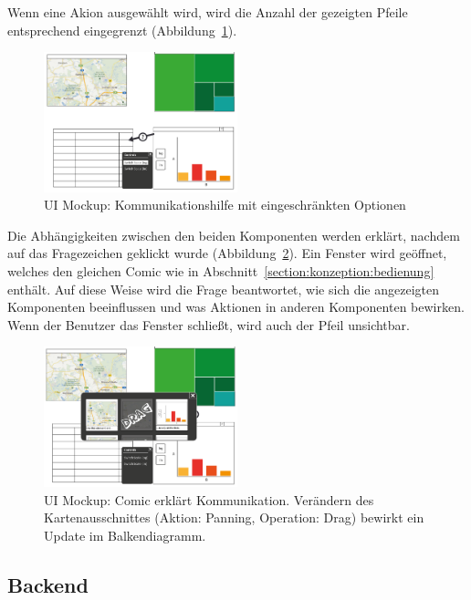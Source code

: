 \documentclass[
	headsepline,
	footsepline,
	fontsize=12pt,
	bibliography=totoc
]{scrbook}
\begin{document}
Wenn eine Akion ausgewählt wird, wird die Anzahl der gezeigten Pfeile entsprechend eingegrenzt (Abbildung~\ref{figure:kommunikation-step2}).

\begin{figure}[htbp]
   \centering
   \includegraphics[width=0.5\textwidth]{images/konzeption-kommunikation-step2.png}
   \caption{UI Mockup: Kommunikationshilfe mit eingeschränkten Optionen}
   \label{figure:kommunikation-step2}
\end{figure}

Die Abhängigkeiten zwischen den beiden Komponenten werden erklärt, nachdem auf das Fragezeichen geklickt wurde (Abbildung~\ref{figure:kommunikation-step3}). Ein Fenster wird geöffnet, welches den gleichen Comic wie in Abschnitt~\ref{section:konzeption:bedienung} enthält. Auf diese Weise wird die Frage beantwortet, wie sich die angezeigten Komponenten beeinflussen und was Aktionen in anderen Komponenten bewirken. Wenn der Benutzer das Fenster schließt, wird auch der Pfeil unsichtbar.

\begin{figure}[htbp]
   \centering
   \includegraphics[width=0.5\textwidth]{images/konzeption-kommunikation-step3.png}
   \caption{UI Mockup: Comic erklärt Kommunikation. Verändern des Kartenausschnittes (Aktion: Panning, Operation: Drag) bewirkt ein Update im Balkendiagramm.}
   \label{figure:kommunikation-step3}
\end{figure}

\subsection{Backend}
\label{section:konzeption:kommunikation:backend}
\end{document}
